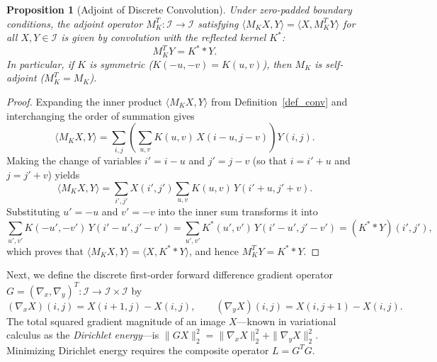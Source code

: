 \documentclass{amsart}
\newtheorem{proposition}[theorem]{Proposition}
\begin{document}
\begin{proposition}[Adjoint of Discrete Convolution]\label{prop_adjoint}
    Under zero-padded boundary conditions, the adjoint operator $M_K^T : \mathcal{I} \to \mathcal{I}$ satisfying $\langle M_K X, Y \rangle = \langle X, M_K^T Y \rangle$ for all $X, Y \in \mathcal{I}$ is given by convolution with the reflected kernel $K^*$:
    \[
        M_K^T Y = K^* * Y.
    \]
    In particular, if $K$ is symmetric ($K(-u, -v) = K(u, v)$), then $M_K$ is self-adjoint ($M_K^T = M_K$).
\end{proposition}
\begin{proof}
    Expanding the inner product $\langle M_K X, Y \rangle$ from Definition~\ref{def_conv} and interchanging the order of summation gives
    \[
        \langle M_K X, Y \rangle = \sum_{i,j} \left(\sum_{u,v} K(u,v)\, X(i-u, j-v)\right) Y(i,j).
    \]
    Making the change of variables $i' = i - u$ and $j' = j - v$ (so that $i = i' + u$ and $j = j' + v$) yields
    \[
        \langle M_K X, Y \rangle = \sum_{i', j'} X(i', j') \sum_{u,v} K(u,v)\, Y(i' + u, j' + v).
    \]
    Substituting $u' = -u$ and $v' = -v$ into the inner sum transforms it into
    \[
        \sum_{u',v'} K(-u', -v')\, Y(i' - u', j' - v') = \sum_{u',v'} K^*(u', v')\, Y(i' - u', j' - v') = (K^* * Y)(i', j'),
    \]
    which proves that $\langle M_K X, Y \rangle = \langle X, K^* * Y \rangle$, and hence $M_K^T Y = K^* * Y$.
\end{proof}

Next, we define the discrete first-order forward difference gradient operator $G = (\nabla_x, \nabla_y)^T : \mathcal{I} \to \mathcal{I} \times \mathcal{I}$ by
\begin{equation}\label{eq_grad_op}
    (\nabla_x X)(i, j) = X(i+1, j) - X(i, j), \qquad (\nabla_y X)(i, j) = X(i, j+1) - X(i, j).
\end{equation}
The total squared gradient magnitude of an image $X$---known in variational calculus as the \emph{Dirichlet energy}---is $\|G X\|_2^2 = \|\nabla_x X\|_2^2 + \|\nabla_y X\|_2^2$. Minimizing Dirichlet energy requires the composite operator $L = G^T G$.
\end{document}
